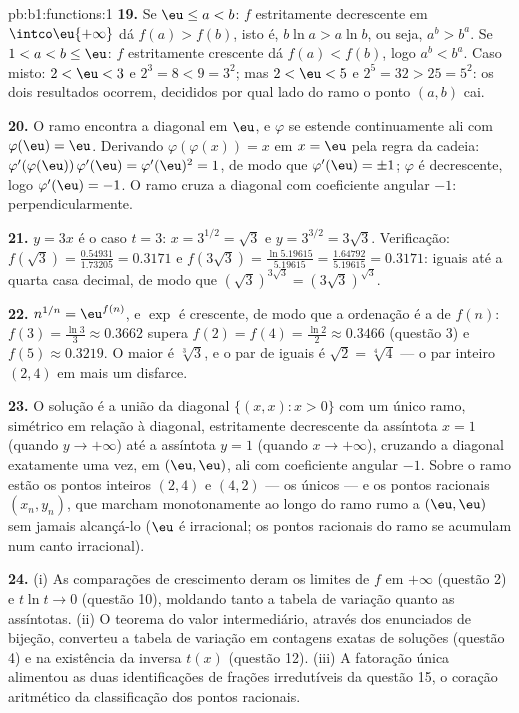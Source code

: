 \begin{solution}{pb:b1:functions:1}
\textbf{19.} Se $\eu \leq a < b$: $f$ estritamente decrescente em
$\intco\eu{+\infty}$ dá $f(a) > f(b)$, isto é, $b\ln a > a\ln
b$, ou seja, $a^b > b^a$. Se $1 < a < b \leq \eu$: $f$ estritamente
crescente dá $f(a) < f(b)$, logo $a^b < b^a$. Caso misto:
$2 < \eu < 3$ e $2^3 = 8 < 9 = 3^2$; mas $2 < \eu < 5$ e
$2^5 = 32 > 25 = 5^2$: os dois resultados ocorrem, decididos por qual lado
do ramo o ponto $(a, b)$ cai.

\textbf{20.} O ramo encontra a diagonal em $\eu$, e $\varphi$
se estende continuamente ali com $\varphi(\eu) = \eu$.
Derivando $\varphi(\varphi(x)) = x$ em $x = \eu$ pela
regra da cadeia: $\varphi'(\varphi(\eu))\,\varphi'(\eu) =
\varphi'(\eu)^2 = 1$, de modo que $\varphi'(\eu) = \pm1$; $\varphi$ é
decrescente, logo $\varphi'(\eu) = -1$. O ramo cruza a
diagonal com coeficiente angular $-1$: perpendicularmente.

\textbf{21.} $y = 3x$ é o caso $t = 3$: $x = 3^{1/2} = \sqrt3$
e $y = 3^{3/2} = 3\sqrt3$. Verificação: $f(\sqrt3) =
\frac{0.54931}{1.73205} = 0.3171$ e $f(3\sqrt3) =
\frac{\ln 5.19615}{5.19615} = \frac{1.64792}{5.19615} = 0.3171$:
iguais até a quarta casa decimal, de modo que $(\sqrt3)^{3\sqrt3} =
(3\sqrt3)^{\sqrt3}$.

\textbf{22.} $n^{1/n} = \eu^{f(n)}$, e $\exp$ é crescente, de modo que
a ordenação é a de $f(n)$: $f(3) = \frac{\ln3}3 \approx
0.3662$ supera $f(2) = f(4) = \frac{\ln2}2 \approx 0.3466$ (questão
3) e $f(5) \approx 0.3219$. O maior é $\sqrt[3]3$, e o
par de iguais é $\sqrt2 = \sqrt[4]4$ --- o par inteiro $(2, 4)$
em mais um disfarce.

\textbf{23.} O  solução é a união da diagonal $\{(x,
x) : x > 0\}$ com um único ramo, simétrico em relação à diagonal,
estritamente decrescente da assíntota $x = 1$ (quando $y \to
+\infty$) até a assíntota $y = 1$ (quando $x \to +\infty$), cruzando
a diagonal exatamente uma vez, em $(\eu, \eu)$, ali com coeficiente
angular $-1$. Sobre o ramo estão os pontos inteiros $(2, 4)$ e $(4, 2)$
--- os únicos --- e os pontos racionais $(x_n, y_n)$,
que marcham monotonamente ao longo do ramo rumo a $(\eu, \eu)$
sem jamais alcançá-lo ($\eu$ é irracional; os pontos racionais do ramo
se acumulam num canto irracional).

\textbf{24.} (i) As comparações de crescimento deram os limites de $f$ em
$+\infty$ (questão 2) e $t\ln t \to 0$ (questão 10),
moldando tanto a tabela de variação quanto as assíntotas. (ii) O
teorema do valor intermediário, através dos enunciados de bijeção,
converteu a tabela de variação em contagens exatas de soluções
(questão 4) e na existência da  inversa $t(x)$
(questão 12). (iii) A fatoração única alimentou as duas
identificações de frações irredutíveis da questão 15, o coração
aritmético da classificação dos pontos racionais.


\end{solution}
